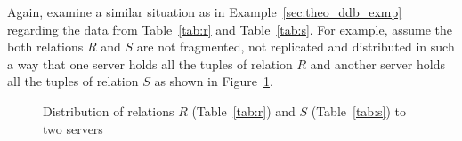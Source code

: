 \begin{exmp}
Again, examine a similar situation as in Example~\ref{sec:theo_ddb_exmp} regarding the data from Table~\ref{tab:r} and Table~\ref{tab:s}. For example, 
assume the both relations $R$ and $S$ are not fragmented, not replicated and distributed in such a way that one server holds all the tuples of relation 
$R$ and another server holds all the tuples of relation $S$ as shown in Figure~\ref{fig:dqp_rs_simple}.


\begin{figure}[h]
\caption{Distribution of relations $R$ (Table~\ref{tab:r}) and $S$ (Table~\ref{tab:s}) to two servers}
\label{fig:dqp_rs_simple}
\end{figure}



\end{exmp}
